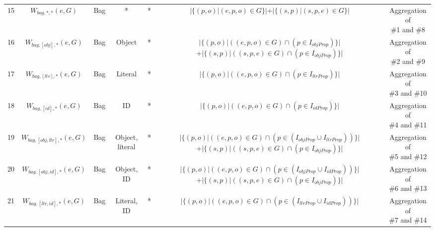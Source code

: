 \begin{center}
{\begin{threeparttable}
\begin{tabular}{|c | c c c c c c |}
        15 & $W_{bag,*,*}(e,G)$ & Bag & * & * & $|\{(p, o) | (e, p, o) \in G\}| + |\{(s, p) | (s, p, e) \in G\}|$ & \CellWithForceBreak{Aggregation of \\ \#1 and \#8} \\
        16 & $W_{bag,[obj],*}(e,G)$ & Bag & Object & * &  \CellWithForceBreak{$|\{(p,o) | ((e, p, o) \in G) \cap (p \in I_{objProp})\}|$ \\ $ + |\{(s,p) | ((s, p, e) \in G) \cap (p \in I_{objProp})\}|$} & \CellWithForceBreak{Aggregation of \\ \#2 and \#9} \\
        17 & $W_{bag,[ltr],*}(e,G)$ & Bag & Literal & * & $|\{(p,o) | ((e, p, o) \in G) \cap (p \in I_{ltrProp})\}|$ & \CellWithForceBreak{Aggregation of \\ \#3 and \#10} \\
        18 & $W_{bag,[id],*}(e,G)$ & Bag & ID & * & $|\{(p,o) | ((e, p, o) \in G) \cap (p \in I_{idProp})\}|$ & \CellWithForceBreak{Aggregation of \\ \#4 and \#11} \\
        19 & $W_{bag,[obj, ltr],*}(e,G)$ & Bag & Object, literal & * & \CellWithForceBreak{$|\{(p,o) | ((e, p, o) \in G) \cap (p \in (I_{objProp} \cup I_{ltrProp}))\}|$  \\ $ + |\{(s,p) | ((s, p, e) \in G) \cap (p \in I_{objProp})\}|$} & \CellWithForceBreak{Aggregation of \\ \#5 and \#12} \\
        20 & $W_{bag,[obj, id],*}(e,G)$ & Bag & Object, ID & * & \CellWithForceBreak{$|\{(p,o) | ((e, p, o) \in G) \cap (p \in (I_{objProp} \cup I_{idProp}))\}|$ \\ $ + |\{(s,p) | ((s, p, e) \in G) \cap (p \in I_{objProp})\}|$} & \CellWithForceBreak{Aggregation of \\ \#6 and \#13} \\
        21 & $W_{bag,[ltr, id],*}(e,G)$ & Bag & Literal, ID & * & $|\{(p,o) | ((e, p, o) \in G) \cap (p \in (I_{ltrProp} \cup I_{idProp}))\}|$ & \CellWithForceBreak{Aggregation of \\ \#7 and \#14} \\


\end{tabular}
\end{threeparttable}}
\end{center}

